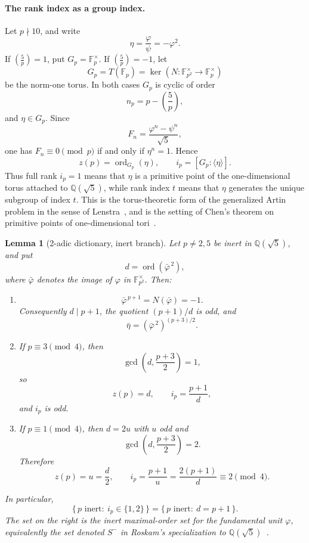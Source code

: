\documentclass[11pt]{amsart}
\theoremstyle{plain}
\newtheorem{lemma}[theorem]{Lemma}
\theoremstyle{definition}
\newcommand{\leg}[2]{\left(\frac{#1}{#2}\right)}
\begin{document}
\paragraph{The rank index as a group index.}
Let \(p\nmid 10\), and write
\[
  \eta=\frac{\varphi}{\psi}=-\varphi^{2}.
\]
If \(\leg{5}{p}=1\), put \(G_p=\mathbb F_p^{\times}\).  If
\(\leg{5}{p}=-1\), let
\[
  G_p=T(\mathbb F_p)
  =
  \ker\!\left(
    N:\mathbb F_{p^{2}}^{\times}\to\mathbb F_p^{\times}
  \right)
\]
be the norm-one torus.  In both cases \(G_p\) is cyclic of order
\[
  n_p=p-\leg{5}{p},
\]
and \(\eta\in G_p\).  Since
\[
  F_n=\frac{\varphi^{n}-\psi^{n}}{\sqrt5},
\]
one has \(F_n\equiv0\pmod p\) if and only if \(\eta^n=1\).  Hence
\[
  z(p)=\operatorname{ord}_{G_p}(\eta),
  \qquad
  i_p=[G_p:\langle\eta\rangle].
\]
Thus full rank \(i_p=1\) means that \(\eta\) is a primitive point of
the one-dimensional torus attached to \(\mathbb Q(\sqrt5)\), while
rank index \(t\) means that \(\eta\) generates the unique subgroup of
index \(t\).  This is the torus-theoretic form of the generalized
Artin problem in the sense of Lenstra~\cite{Lenstra1977}, and is the
setting of Chen's theorem on primitive points of one-dimensional
tori~\cite{Chen2002}.
\begin{lemma}[2-adic dictionary, inert branch]\label{lem:2adic}
Let \(p\neq2,5\) be inert in \(\mathbb Q(\sqrt5)\), and put
\[
  d=\operatorname{ord}(\bar\varphi^{\,2}),
\]
where \(\bar\varphi\) denotes the image of \(\varphi\) in
\(\mathbb F_{p^2}^{\times}\).  Then:
\begin{enumerate}[label=\textup{(\roman*)}]
\item
\[
  \bar\varphi^{\,p+1}=N(\bar\varphi)=-1.
\]
Consequently \(d\mid p+1\), the quotient \((p+1)/d\) is odd, and
\[
  \bar\eta=(\bar\varphi^{\,2})^{(p+3)/2}.
\]

\item
If \(p\equiv3\pmod4\), then
\[
  \gcd\!\left(d,\frac{p+3}{2}\right)=1,
\]
so
\[
  z(p)=d,\qquad i_p=\frac{p+1}{d},
\]
and \(i_p\) is odd.

\item
If \(p\equiv1\pmod4\), then \(d=2u\) with \(u\) odd and
\[
  \gcd\!\left(d,\frac{p+3}{2}\right)=2.
\]
Therefore
\[
  z(p)=u=\frac d2,\qquad
  i_p=\frac{p+1}{u}=\frac{2(p+1)}{d}\equiv2\pmod4.
\]
\end{enumerate}
In particular,
\begin{equation}\label{eq:dictionary}
\{\,p\text{ inert}:\ i_p\in\{1,2\}\,\}
=
\{\,p\text{ inert}:\ d=p+1\,\}.
\end{equation}
The set on the right is the inert maximal-order set for the fundamental
unit \(\varphi\), equivalently the set denoted \(S^{-}\) in Roskam's
specialization to \(\mathbb Q(\sqrt5)\)~\cite{Roskam2000}.
\end{lemma}
\end{document}
